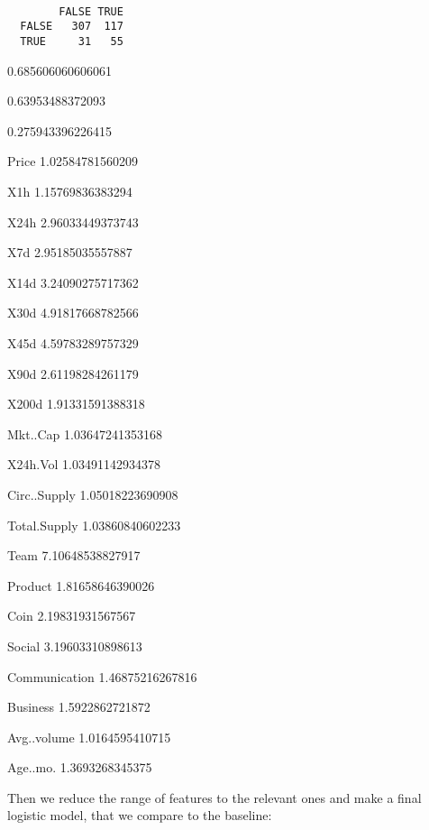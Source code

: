 \documentclass[11pt]{article}
\begin{document}
    \begin{verbatim}

        FALSE TRUE
  FALSE   307  117
  TRUE     31   55
    \end{verbatim}


    0.685606060606061


    0.63953488372093


    0.275943396226415


    \begin{description*}
\item[Price] 1.02584781560209
\item[X1h] 1.15769836383294
\item[X24h] 2.96033449373743
\item[X7d] 2.95185035557887
\item[X14d] 3.24090275717362
\item[X30d] 4.91817668782566
\item[X45d] 4.59783289757329
\item[X90d] 2.61198284261179
\item[X200d] 1.91331591388318
\item[Mkt..Cap] 1.03647241353168
\item[X24h.Vol] 1.03491142934378
\item[Circ..Supply] 1.05018223690908
\item[Total.Supply] 1.03860840602233
\item[Team] 7.10648538827917
\item[Product] 1.81658646390026
\item[Coin] 2.19831931567567
\item[Social] 3.19603310898613
\item[Communication] 1.46875216267816
\item[Business] 1.5922862721872
\item[Avg..volume] 1.0164595410715
\item[Age..mo.] 1.3693268345375
\end{description*}



    Then we reduce the range of features to the relevant ones and make a
final logistic model, that we compare to the baseline:
\end{document}
